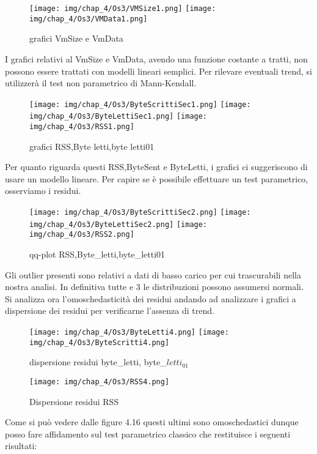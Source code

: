 \begin{figure}[H]
    \centering
    \texttt{[image: img/chap\_4/Os3/VMSize1.png]}
    \texttt{[image: img/chap\_4/Os3/VMData1.png]}
    \caption{grafici VmSize e VmData}
    \label{fig:sis_2_25_k}
\end{figure}
\noindent
I grafici relativi al VmSize e VmData, avendo una funzione costante a tratti, non possono essere trattati con modelli lineari semplici.
Per rilevare eventuali trend, si utilizzerà il test non parametrico di Mann-Kendall.
\begin{figure}[H]
    \centering
    \texttt{[image: img/chap\_4/Os3/ByteScrittiSec1.png]}
    \texttt{[image: img/chap\_4/Os3/ByteLettiSec1.png]}
    \texttt{[image: img/chap\_4/Os3/RSS1.png]}
    \caption{grafici RSS,Byte letti,byte letti01}
    \label{fig:sis_2_25_k}
\end{figure}
\noindent
Per quanto riguarda questi RSS,ByteSent e ByteLetti, i grafici ci suggeriscono di usare un modello lineare. Per capire se è possibile effettuare un test parametrico, osserviamo i residui.
\begin{figure}[H]
    \centering
    \texttt{[image: img/chap\_4/Os3/ByteScrittiSec2.png]}
    \texttt{[image: img/chap\_4/Os3/ByteLettiSec2.png]}
    \texttt{[image: img/chap\_4/Os3/RSS2.png]}
    \caption{qq-plot RSS,Byte\_letti,byte\_letti01}
    \label{fig:residui}
\end{figure}
\noindent
Gli outlier presenti sono relativi a dati di basso carico per cui trascurabili nella nostra analisi.
In definitiva tutte e 3 le distribuzioni possono assumersi normali.
Si analizza ora l'omoschedasticità dei residui andando ad analizzare i grafici a dispersione dei residui per verificarne l'assenza di trend.
\begin{figure}[H]
    \centering
    \texttt{[image: img/chap\_4/Os3/ByteLetti4.png]}
    \texttt{[image: img/chap\_4/Os3/ByteScritti4.png]}
    \caption{dispersione residui byte\_letti, byte\_$letti_01$}
    \label{fig:residui_omoschedastici}
\end{figure}
\begin{figure}[H]
    \centering
    \texttt{[image: img/chap\_4/Os3/RSS4.png]}
    \caption{Dispersione residui RSS}
    \label{fig:residui_non_omoschedastici}
\end{figure}
\noindent
Come si può vedere dalle figure 4.16 questi ultimi sono omoschedastici dunque posso fare affidamento sul test parametrico classico che
restituisce i seguenti risultati:

